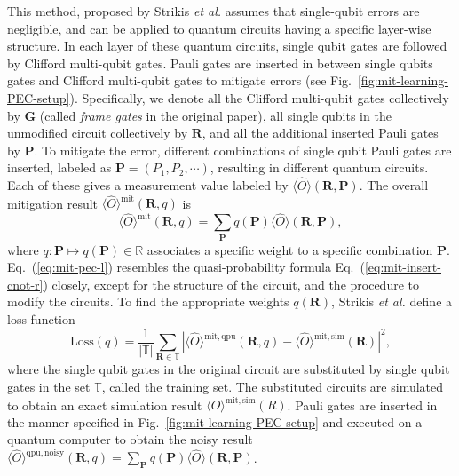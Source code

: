 This method, proposed by Strikis \textit{et al.} \cite{strikisLearningbasedQuantumError2020} assumes that single-qubit errors are negligible, and can be applied to quantum circuits having a specific layer-wise structure.
In each layer of these quantum circuits, single qubit gates are followed by Clifford multi-qubit gates. Pauli gates are inserted in between single qubits gates and Clifford multi-qubit gates to mitigate errors (see
Fig.~\ref{fig:mit-learning-PEC-setup}). Specifically, we denote all the Clifford multi-qubit gates collectively by $\mathbf{G}$ (called \textit{frame gates} in the original paper), all single qubits in the unmodified circuit collectively by $\mathbf{R}$, and all the additional inserted Pauli gates by $\mathbf{P}$. To mitigate the error, different combinations of single qubit Pauli gates are inserted, labeled as $\mathbf{P}=(P_1,P_2,\cdots )$, resulting in different quantum circuits. Each of these gives a measurement value labeled by $\langle \hat{O} \rangle(\mathbf{R},\mathbf{P})$. The overall mitigation result $\langle \hat{O} \rangle^{\mathrm{mit}}( \mathbf{R}, q)$ is
\begin{equation}
    \label{eq:mit-pec-l}
    \langle \hat{O} \rangle^{\mathrm{mit}}( \mathbf{R},q) =\sum _{\mathbf{P}} q( \mathbf{P}) \langle \hat{O} \rangle( \mathbf{R},\mathbf{P}),
\end{equation}
where $q:\mathbf{P}\mapsto q( \mathbf{P}) \in \mathbb{R}$ associates a specific weight to a specific combination $\mathbf{P}$. Eq.~(\ref{eq:mit-pec-l}) resembles the quasi-probability formula Eq.~(\ref{eq:mit-insert-cnot-r}) closely, except for the structure of the circuit, and the procedure to modify the circuits. To find the appropriate weights $q(\mathbf{R})$, Strikis \textit{et al.} \cite{strikisLearningbasedQuantumError2020} define a loss function
\begin{equation}
    \label{eq:mit-pec-lcost}
    \mathrm{Loss}( q) =\frac{1}{|\mathbb{T} |}\sum _{\mathbf{R}\in \mathbb{T}} |\langle \hat{O} \rangle^{\mathrm{mit,qpu}}( \mathbf{R},q) -\langle \hat{O} \rangle^{\mathrm{mit,sim}}( \mathbf{R}) |^2,
\end{equation}
where the single qubit gates in the original circuit are substituted by single qubit gates in the set $\mathbb{T}$, called the training set. The substituted circuits are simulated to obtain an exact simulation result $\langle \hat{O} \rangle^{\mathrm{mit,sim}}(R)$. Pauli gates are inserted in the manner specified in Fig.~\ref{fig:mit-learning-PEC-setup} and executed on a quantum computer to obtain the noisy result $\langle \hat{O} \rangle^{\mathrm{qpu,noisy}}( \mathbf{R},q)=\sum_\mathbf{P} q(\mathbf{P}) \langle \hat{O} \rangle(\mathbf{R},\mathbf{P})$.

